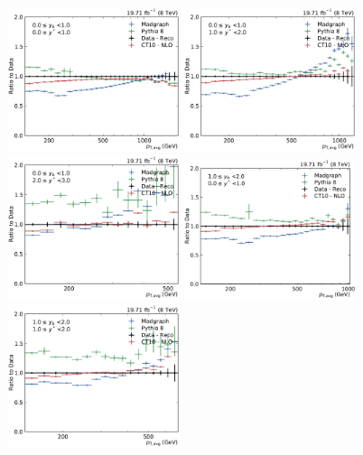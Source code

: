 \begin{figure}[htbp]
    \centering
    \includegraphics[width=0.45\textwidth]{figures/measurement/ratio_reco_to_data_yb0ys0.pdf}\hfill
    \includegraphics[width=0.45\textwidth]{figures/measurement/ratio_reco_to_data_yb0ys1.pdf}
    \includegraphics[width=0.45\textwidth]{figures/measurement/ratio_reco_to_data_yb0ys2.pdf}\hfill
    \includegraphics[width=0.45\textwidth]{figures/measurement/ratio_reco_to_data_yb1ys0.pdf}
    \includegraphics[width=0.45\textwidth]{figures/measurement/ratio_reco_to_data_yb1ys1.pdf}\hfill

\end{figure}
